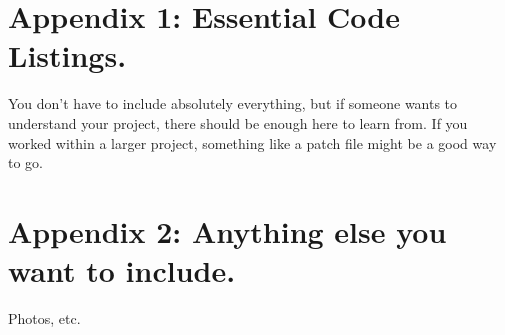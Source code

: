 \documentclass[journal,10pt,onecolumn,compsoc]{IEEEtran}
\begin{document}
    \section{Appendix 1: Essential Code Listings.}
    You don't have to include absolutely everything, but if someone wants to understand your project, there should be enough here to learn from. If you worked within a larger project, something like a patch file might be a good way to go.
    
    
    \section{Appendix 2: Anything else you want to include.}
    Photos, etc.
    
    
    
    
\end{document}
